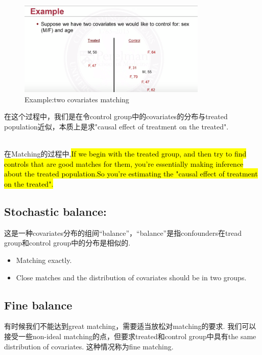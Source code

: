 \begin{figure}
	\setlength{\abovecaptionskip}{0pt}     %
	\setlength{\belowcaptionskip}{10pt}
	\vspace{-0cm}  %
	\setlength{\abovecaptionskip}{-0cm}   %
	\setlength{\belowcaptionskip}{-0cm}   %
	\centering
	\includegraphics[width=0.8\textwidth]{figure/twocovariates.png}
	\caption{Example:two covariates matching}
	\label{twocovariates}
\end{figure}
在这个过程中，我们是在令control group中的covariates的分布与treated population近似，本质上是求"causal effect of treatment on the treated".

\\
在Matching的过程中,\hl {If we begin with the treated group, and then try to find controls that are good matches for them, you're essentially making inference about the treated population.So you're estimating the "causal effect of treatment on the treated".}

\subsection{Stochastic balance:}
这是一种covariates分布的组间“balance”，“balance”是指confounders在tread group和control group中的分布是相似的. 
\begin{itemize}
   \item Matching {\color{red}{not}} exactly.
   \item Close matches and the distribution of covariates should be {\color{red}{similar}} in two groups.
\end{itemize}


\subsection{Fine balance}
有时候我们不能达到great matching，需要适当放松对matching的要求. 我们可以接受一些non-ideal matching的点，但要求treated和control group中具有the same distribution of covariates. 这种情况称为{\color{red}fine matching}.

